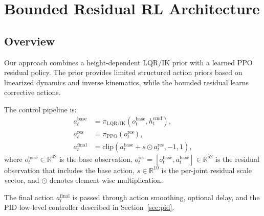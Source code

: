 \documentclass[conference]{IEEEtran}
\begin{document}
\section{Bounded Residual RL Architecture}

\subsection{Overview}
Our approach combines a height-dependent LQR/IK prior with a learned PPO residual policy.
The prior provides limited structured action priors based on linearized dynamics
and inverse kinematics, while the bounded residual learns corrective actions.

The control pipeline is:
\begin{equation}
\begin{aligned}
a_t^{\mathrm{base}} &= \pi_{\mathrm{LQR/IK}}(o_t^{\mathrm{base}}, h_t^{\mathrm{cmd}}), \\
a_t^{\mathrm{res}} &= \pi_{\mathrm{PPO}}(o_t^{\mathrm{res}}), \\
a_t^{\mathrm{final}} &= \mathrm{clip}(a_t^{\mathrm{base}} + s \odot a_t^{\mathrm{res}}, -1, 1),
\end{aligned}
\end{equation}
where $o_t^{\mathrm{base}} \in \mathbb{R}^{42}$ is the base observation,
$o_t^{\mathrm{res}} = [o_t^{\mathrm{base}}, a_t^{\mathrm{base}}] \in \mathbb{R}^{52}$
is the residual observation that includes the base action,
$s \in \mathbb{R}^{10}$ is the per-joint residual scale vector,
and $\odot$ denotes element-wise multiplication.

The final action $a_t^{\mathrm{final}}$ is passed through action smoothing,
optional delay, and the PID low-level controller described in Section~\ref{sec:pid}.
\end{document}
